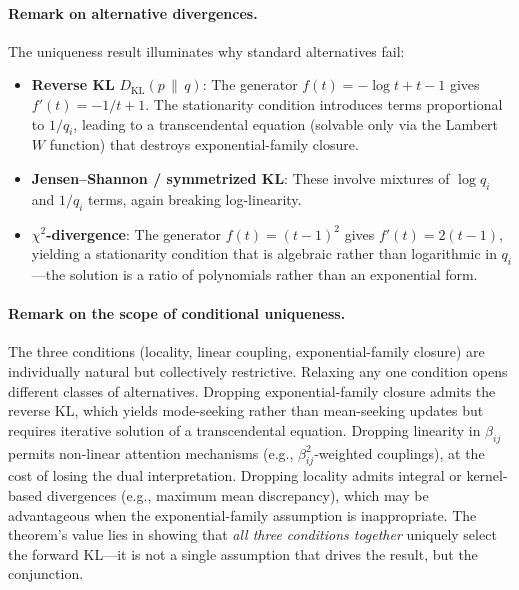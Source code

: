 \documentclass[twoside,11pt]{article}
\begin{document}
\paragraph{Remark on alternative divergences.}
The uniqueness result illuminates why standard alternatives fail:
\begin{itemize}
    \item \textbf{Reverse KL} $D_{\mathrm{KL}}(p\,\|\,q)$: The generator $f(t)=-\log t + t - 1$ gives $f'(t)=-1/t+1$. The stationarity condition introduces terms proportional to $1/q_i$, leading to a transcendental equation (solvable only via the Lambert $W$ function) that destroys exponential-family closure.
    \item \textbf{Jensen--Shannon / symmetrized KL}: These involve mixtures of $\log q_i$ and $1/q_i$ terms, again breaking log-linearity.
    \item \textbf{$\chi^2$-divergence}: The generator $f(t)=(t-1)^2$ gives $f'(t)=2(t-1)$, yielding a stationarity condition that is algebraic rather than logarithmic in $q_i$---the solution is a ratio of polynomials rather than an exponential form.
\end{itemize}

\paragraph{Remark on the scope of conditional uniqueness.}
The three conditions (locality, linear coupling, exponential-family closure) are individually natural but collectively restrictive. Relaxing any one condition opens different classes of alternatives. Dropping exponential-family closure admits the reverse KL, which yields mode-seeking rather than mean-seeking updates but requires iterative solution of a transcendental equation. Dropping linearity in $\beta_{ij}$ permits non-linear attention mechanisms (e.g., $\beta_{ij}^2$-weighted couplings), at the cost of losing the dual interpretation. Dropping locality admits integral or kernel-based divergences (e.g., maximum mean discrepancy), which may be advantageous when the exponential-family assumption is inappropriate.
The theorem's value lies in showing that \emph{all three conditions together} uniquely select the forward KL---it is not a single assumption that drives the result, but the conjunction.
\end{document}
